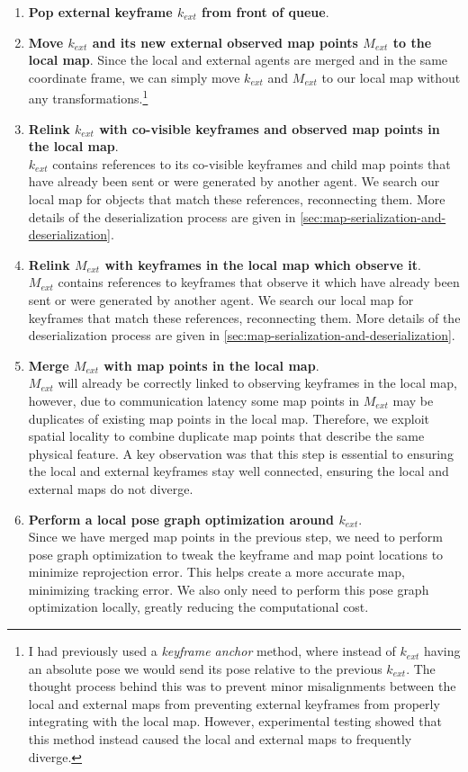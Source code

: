 \begin{enumerate}
    \item \textbf{Pop external keyframe $k_{ext}$ from front of queue}.
    \item \textbf{Move $k_{ext}$ and its new external observed map points $M_{ext}$ to the local map}.
          Since the local and external agents are merged and in the same coordinate frame, we can simply move $k_{ext}$ and $M_{ext}$ to our local map without any transformations.\footnote[1]{I had previously used a \textit{keyframe anchor} method, where instead of $k_{ext}$ having an absolute pose we would send its pose relative to the previous $k_{ext}$. The thought process behind this was to prevent minor misalignments between the local and external maps from preventing external keyframes from properly integrating with the local map. However, experimental testing showed that this method instead caused the local and external maps to frequently diverge.}
    \item \textbf{Relink $k_{ext}$ with co-visible keyframes and observed map points in the local map}. \\
          $k_{ext}$ contains references to its co-visible keyframes and child map points that have already been sent or were generated by another agent. We search our local map for objects that match these references, reconnecting them. More details of the deserialization process are given in \autoref{sec:map-serialization-and-deserialization}.
    \item \textbf{Relink $M_{ext}$ with keyframes in the local map which observe it}. \\
          $M_{ext}$ contains references to keyframes that observe it which have already been sent or were generated by another agent. We search our local map for keyframes that match these references, reconnecting them. More details of the deserialization process are given in \autoref{sec:map-serialization-and-deserialization}.
    \item \textbf{Merge $M_{ext}$ with map points in the local map}. \\
          $M_{ext}$ will already be correctly linked to observing keyframes in the local map, however, due to communication latency some map points in $M_{ext}$ may be duplicates of existing map points in the local map. Therefore, we exploit spatial locality to combine duplicate map points that describe the same physical feature. A key observation was that this step is essential to ensuring the local and external keyframes stay well connected, ensuring the local and external maps do not diverge.
    \item \textbf{Perform a local pose graph optimization around $k_{ext}$}. \\
          Since we have merged map points in the previous step, we need to perform pose graph optimization to tweak the keyframe and map point locations to minimize reprojection error. This helps create a more accurate map, minimizing tracking error. We also only need to perform this pose graph optimization locally, greatly reducing the computational cost.
\end{enumerate}



